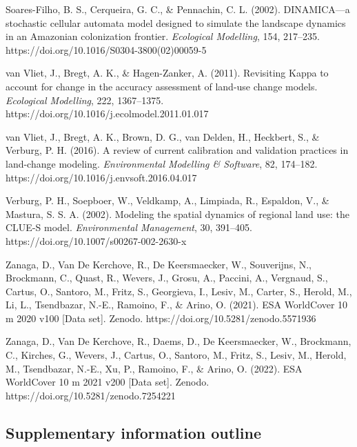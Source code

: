Soares-Filho, B. S., Cerqueira, G. C., \& Pennachin, C. L. (2002).
DINAMICA---a stochastic cellular automata model designed to simulate the
landscape dynamics in an Amazonian colonization frontier.
\emph{Ecological Modelling}, 154, 217--235.
https://doi.org/10.1016/S0304-3800(02)00059-5

van Vliet, J., Bregt, A. K., \& Hagen-Zanker, A. (2011). Revisiting
Kappa to account for change in the accuracy assessment of land-use
change models. \emph{Ecological Modelling}, 222, 1367--1375.
https://doi.org/10.1016/j.ecolmodel.2011.01.017

van Vliet, J., Bregt, A. K., Brown, D. G., van Delden, H., Heckbert, S.,
\& Verburg, P. H. (2016). A review of current calibration and validation
practices in land-change modeling. \emph{Environmental Modelling \&
Software}, 82, 174--182. https://doi.org/10.1016/j.envsoft.2016.04.017

Verburg, P. H., Soepboer, W., Veldkamp, A., Limpiada, R., Espaldon, V.,
\& Mastura, S. S. A. (2002). Modeling the spatial dynamics of regional
land use: the CLUE-S model. \emph{Environmental Management}, 30,
391--405. https://doi.org/10.1007/s00267-002-2630-x

Zanaga, D., Van De Kerchove, R., De Keersmaecker, W., Souverijns, N.,
Brockmann, C., Quast, R., Wevers, J., Grosu, A., Paccini, A., Vergnaud,
S., Cartus, O., Santoro, M., Fritz, S., Georgieva, I., Lesiv, M.,
Carter, S., Herold, M., Li, L., Tsendbazar, N.-E., Ramoino, F., \&
Arino, O. (2021). ESA WorldCover 10 m 2020 v100 {[}Data set{]}. Zenodo.
https://doi.org/10.5281/zenodo.5571936

Zanaga, D., Van De Kerchove, R., Daems, D., De Keersmaecker, W.,
Brockmann, C., Kirches, G., Wevers, J., Cartus, O., Santoro, M., Fritz,
S., Lesiv, M., Herold, M., Tsendbazar, N.-E., Xu, P., Ramoino, F., \&
Arino, O. (2022). ESA WorldCover 10 m 2021 v200 {[}Data set{]}. Zenodo.
https://doi.org/10.5281/zenodo.7254221

\subsection{Supplementary information
outline}\label{supplementary-information-outline}

